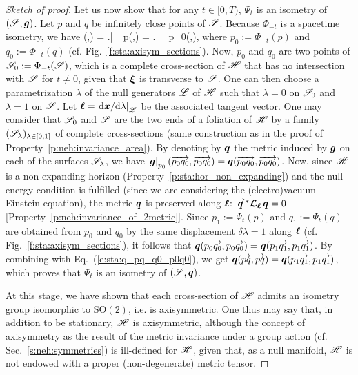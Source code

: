 \begin{proof}[Sketch of proof]
Let us now show that for any $t\in[0,T)$, %
$\Psi_t$ is an isometry of $(\mathscr{S},\bm{g})$.
Let $p$ and $q$ be infinitely close points of $\mathscr{S}$. Because $\Phi_{-t}$ is
a spacetime isometry, we have
\be \label{e:sta:q_pq_q0_p0q0}
 (,) = \left.\right| _p(,)
= \left.\right| _{p_0}(,),
\ee
where $p_0 := \Phi_{-t}(p)$ and $q_0 := \Phi_{-t}(q)$ (cf. Fig.~\ref{f:sta:axisym_sections}).
Now, $p_0$ and $q_0$ are two points of $\mathscr{S}_0 := \Phi_{-t}(\mathscr{S})$, which
is a complete cross-section of $\mathscr{H}$ that has no intersection with $\mathscr{S}$ for $t\neq 0$, given that $\bm{\xi}$ is transverse to $\mathscr{S}$. One can then
choose a parametrization $\lambda$ of the null generators $\mathscr{L}$ of $\mathscr{H}$
such that $\lambda=0$ on $\mathscr{S}_0$ and $\lambda=1$ on $\mathscr{S}$. Let
$\bm{\ell} = \left. \mathrm{d}\bm{x}/\mathrm{d}\lambda \right| _{\mathscr{L}}$ be the associated tangent vector.
One may consider that $\mathscr{S}_0$ and $\mathscr{S}$ are the two ends of a foliation of $\mathscr{H}$
by a family $(\mathscr{S}_\lambda)_{\lambda\in[0,1]}$ of complete cross-sections
(same construction as in the proof of Property~\ref{p:neh:invariance_area}).
By denoting by $\bm{q}$ the metric induced by $\bm{g}$ on each of the surfaces
$\mathscr{S}_\lambda$, we have $\left.\bm{g}\right| _{p_0}(\overrightarrow{p_0q_0},\overrightarrow{p_0q_0}) = \bm{q}(\overrightarrow{p_0q_0},\overrightarrow{p_0q_0})$. Now, since $\mathscr{H}$ is a non-expanding horizon (Property~\ref{p:sta:hor_non_expanding}) and the null
energy condition is fulfilled (since we are considering the (electro)vacuum Einstein equation), the metric $\bm{q}$ is preserved along
$\bm{\ell}$: $\overrightarrow{\bm{q}}^* \bm{\mathcal{L}}_{\bm{\ell}}\, \bm{q} = 0$ [Property~\ref{p:neh:invariance_of_2metric}]. Since $p_1:= \Psi_t(p)$ and $q_1:=\Psi_t(q)$
are obtained from $p_0$ and $q_0$ by the same displacement $\delta\lambda=1$
along $\bm{\ell}$ (cf. Fig.~\ref{f:sta:axisym_sections}),
it follows that $\bm{q}(\overrightarrow{p_0q_0},\overrightarrow{p_0q_0}) =  \bm{q}(\overrightarrow{p_1 q_1},\overrightarrow{p_1 q_1})$.
By combining with Eq.~(\ref{e:sta:q_pq_q0_p0q0}), we get
$\bm{q}(\overrightarrow{pq},\overrightarrow{pq}) = \bm{q}(\overrightarrow{p_1q_1},\overrightarrow{p_1q_1})$, which proves that
$\Psi_t$ is an isometry of $(\mathscr{S}, \bm{q})$.

At this stage, we have shown that each cross-section of $\mathscr{H}$ admits an
isometry group isomorphic to $\mathrm{SO}(2)$, i.e. is axisymmetric.
One thus may say that, in addition to be stationary,
$\mathscr{H}$ is axisymmetric, although the concept of axisymmetry as the result of the
metric invariance under a group action (cf. Sec.~\ref{s:neh:symmetries})
is ill-defined for $\mathscr{H}$, given that, as a null manifold, $\mathscr{H}$
is not endowed with a proper (non-degenerate) metric tensor.


\end{proof}
